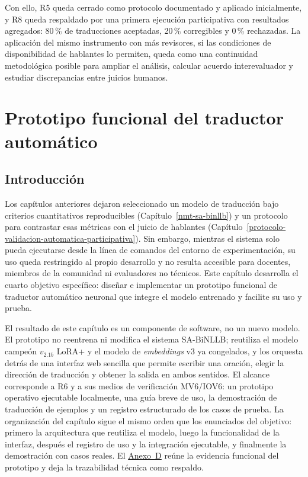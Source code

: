 \documentclass[12pt,a4paper,oneside]{book}
\begin{document}
Con ello, R5 queda cerrado como protocolo documentado y aplicado inicialmente, y R8 queda respaldado por una primera ejecución participativa con resultados agregados: 80\,\% de traducciones aceptadas, 20\,\% corregibles y 0\,\% rechazadas. La aplicación del mismo instrumento con más revisores, si las condiciones de disponibilidad de hablantes lo permiten, queda como una continuidad metodológica posible para ampliar el análisis, calcular acuerdo interevaluador y estudiar discrepancias entre juicios humanos.

\chapter{Prototipo funcional del traductor automático}\label{nmt-prototipo}

\section{Introducción}\label{prototipo-introduccion}

Los capítulos anteriores dejaron seleccionado un modelo de traducción bajo criterios cuantitativos reproducibles (Capítulo~\ref{nmt-sa-binllb}) y un protocolo para contrastar esas métricas con el juicio de hablantes (Capítulo~\ref{protocolo-validacion-automatica-participativa}). Sin embargo, mientras el sistema solo pueda ejecutarse desde la línea de comandos del entorno de experimentación, su uso queda restringido al propio desarrollo y no resulta accesible para docentes, miembros de la comunidad ni evaluadores no técnicos. Este capítulo desarrolla el cuarto objetivo específico: diseñar e implementar un prototipo funcional de traductor automático neuronal que integre el modelo entrenado y facilite su uso y prueba.

El resultado de este capítulo es un componente de software, no un nuevo modelo. El prototipo no reentrena ni modifica el sistema SA-BiNLLB; reutiliza el modelo campeón \(v_{2.1b}\) LoRA+ y el modelo de \emph{embeddings} v3 ya congelados, y los orquesta detrás de una interfaz web sencilla que permite escribir una oración, elegir la dirección de traducción y obtener la salida en ambos sentidos. El alcance corresponde a R6 y a sus medios de verificación MV6/IOV6: un prototipo operativo ejecutable localmente, una guía breve de uso, la demostración de traducción de ejemplos y un registro estructurado de los casos de prueba. La organización del capítulo sigue el mismo orden que los enunciados del objetivo: primero la arquitectura que reutiliza el modelo, luego la funcionalidad de la interfaz, después el registro de uso y la integración ejecutable, y finalmente la demostración con casos reales. El \hyperref[anexo-prototipo]{Anexo~D} reúne la evidencia funcional del prototipo y deja la trazabilidad técnica como respaldo.
\end{document}
